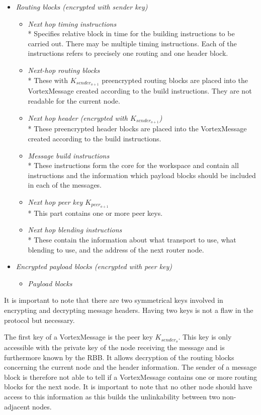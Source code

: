 \documentclass[10pt,journal,compsoc,twocolumn,twoside]{IEEEtran}
\begin{document}
\begin{itemize}
\begin{itemize}
	\end{itemize}
	\item \emph{Routing blocks (encrypted with sender key)}
	\begin{itemize}
		\item \emph{Next hop timing instructions}\\*
		Specifies relative block in time for the building instructions to be carried out. There may be multiple timing instructions. Each of the instructions refers to precisely one routing and one header block.
		\item \emph{Next-hop routing blocks}\\*
		These with $K_{sender_{o+1}}$ preencrypted routing blocks are placed into the VortexMessage created according to the build instructions. They are not readable for the current node.
		\item \emph{Next hop header (encrypted with $K_{sender_{o+1}}$)}\\*
		These preencrypted header blocks are placed into the VortexMessage created according to the build instructions.
		\item \emph{Message build instructions}\\*
		These instructions form the core for the workspace and contain all instructions and the information which payload blocks should be included in each of the messages.
		\item \emph{Next hop peer key $K_{peer_{o+1}}$}\\*
		This part contains one or more peer keys.
		\item \emph{Next hop blending instructions}\\*
		These contain the information about what transport to use, what blending to use, and the address of the next router node.
	\end{itemize}
	\item \emph{Encrypted payload blocks (encrypted with peer key)}
	\begin{itemize}
		\item \emph{Payload blocks}
	\end{itemize}
\end{itemize}

It is important to note that there are two symmetrical keys involved in encrypting and decrypting message headers. Having two keys is not a flaw in the protocol but necessary. 

The first key of a VortexMessage is the peer key $K_{sender_o}$. This key is only accessible with the private key of the node receiving the message and is furthermore known by the RBB. It allows decryption of the routing blocks concerning the current node and the header information. The sender of a message block is therefore not able to tell if a VortexMessage contains one or more routing blocks for the next node. It is important to note that no other node should have access to this information as this builds the unlinkability between two non-adjacent nodes. 
\end{document}
